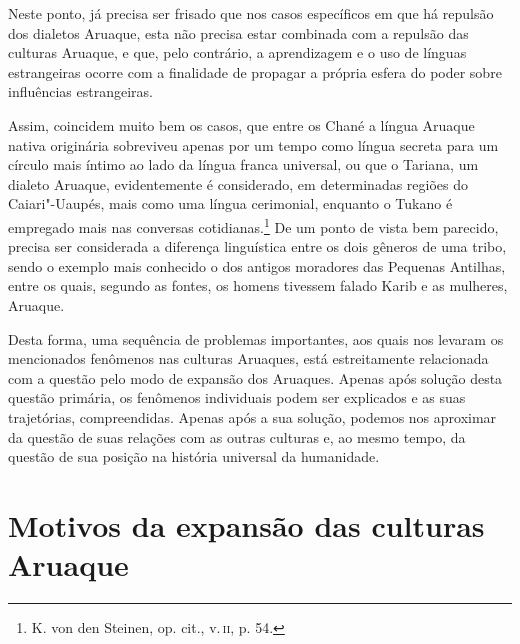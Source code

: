 Neste ponto, já precisa ser frisado que nos casos específicos em que há
repulsão dos dialetos Aruaque, esta não precisa estar combinada com a
repulsão das culturas Aruaque, e que, pelo contrário, a aprendizagem e o
uso de línguas estrangeiras ocorre com a finalidade de propagar a
própria esfera do poder sobre influências estrangeiras.

Assim, coincidem muito bem os casos, que entre os Chané a língua Aruaque
nativa originária sobreviveu apenas por um tempo como língua secreta
para um círculo mais íntimo ao lado da língua franca universal, ou que o
Tariana, um dialeto Aruaque, evidentemente é considerado, em
determinadas regiões do Caiari"-Uaupés, mais como uma língua cerimonial,
enquanto o Tukano é empregado mais nas conversas cotidianas.\footnote{K.
  von den Steinen, op. cit., v.\,\textsc{ii}, p. 54.} De um ponto de vista bem
parecido, precisa ser considerada a diferença linguística entre os dois
gêneros de uma tribo, sendo o exemplo mais conhecido o dos antigos
moradores das Pequenas Antilhas, entre os quais, segundo as fontes, os
homens tivessem falado Karib e as mulheres, Aruaque.

Desta forma, uma sequência de problemas importantes, aos quais nos
levaram os mencionados fenômenos nas culturas Aruaques, está
estreitamente relacionada com a questão pelo modo de expansão dos
Aruaques. Apenas após solução desta questão primária, os fenômenos
individuais podem ser explicados e as suas trajetórias, compreendidas.
Apenas após a sua solução, podemos nos aproximar da questão de suas
relações com as outras culturas e, ao mesmo tempo, da questão de sua
posição na história universal da humanidade.


\chapter{Motivos da expansão das culturas Aruaque}

